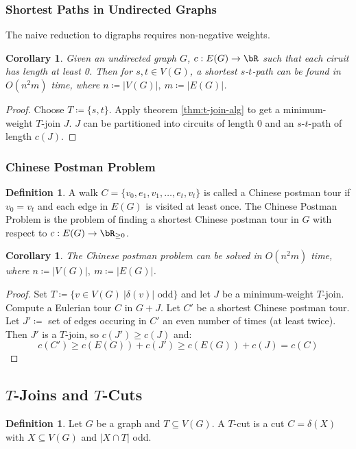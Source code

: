 \documentclass[11pt, a4paper]{article}
\newcommand{\abs}[1]{\left\lvert#1\right\rvert}
\newcommand{\set}[1]{\{#1\}}
\newtheorem{cor}[theorem]{Corollary}
\theoremstyle{remark}
\theoremstyle{definition}
\newtheorem{definition}[theorem]{Definition}
\begin{document}
\subsubsection{Shortest Paths in Undirected Graphs}
The naive reduction to digraphs requires non-negative weights.

\begin{cor}
	Given an undirected graph $G$, $c: E(G)\to \bR$ such that each ciruit
	has length at least 0. Then for $s,t\in V(G)$, a shortest $s$-$t$-path
	can be found in $O(n^2m)$ time, where $n\coloneqq\abs{V(G)},\ m\coloneqq\abs{E(G)}$.
\end{cor}
\begin{proof}
	Choose $T\coloneqq\set{s,t}$. Apply theorem \ref{thm:t-join-alg} to get
	a minimum-weight $T$-join $J$. $J$ can be partitioned into circuits of
	length 0 and an $s$-$t$-path of length $c(J)$.
\end{proof}

\subsubsection{Chinese Postman Problem}
\begin{definition}
	A walk $C=\set{v_0,e_1,v_1,\ldots,e_t,v_t}$ is called a Chinese postman
	tour if $v_0=v_t$ and each edge in $E(G)$ is visited at least once.
	The Chinese Postman Problem is the problem of finding a shortest
	Chinese postman tour in $G$ with respect to $c: E(G)\to\bR_{\geq0}$.
\end{definition}

\begin{cor}
	The Chinese postman problem can be solved in $O(n^2m)$ time, where
	$n\coloneqq \abs{V(G)},\ m\coloneqq\abs{E(G)}$.
\end{cor}
\begin{proof}
	Set $T\coloneqq \set{v\in V(G)\ \abs{\delta(v)}\text{ odd}}$ and
	let $J$ be a minimum-weight $T$-join. Compute a Eulerian tour $C$ in $G+J$.
	Let $C'$ be a shortest Chinese postman tour. Let
	$J'\coloneqq$ set of edges occuring in $C'$ an even number of times
	(at least twice). Then $J'$ is a $T$-join, so $c(J')\geq c(J)$ and:
	\[c(C')\geq c(E(G))+c(J')\geq c(E(G))+c(J)=c(C)\]
\end{proof}

\subsection{\texorpdfstring{$T$}{T}-Joins and \texorpdfstring{$T$}{T}-Cuts}
\begin{definition}
	Let $G$ be a graph and $T\subseteq V(G)$. A $T$-cut is a cut
	$C=\delta(X)$ with $X\subseteq V(G)$ and $\abs{X\cap T}$ odd.
\end{definition}
\end{document}
